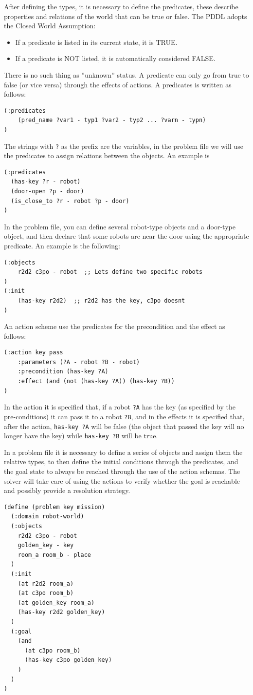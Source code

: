 \documentclass[10pt, letterpaper]{report}
\begin{document}
After defining the types, it is necessary to define the predicates, these describe properties and relations of the world that can be true or false.
The PDDL adopts the Closed World Assumption:
\begin{itemize}
\item If a predicate is listed in its current state, it is TRUE.
\item If a predicate is NOT listed, it is automatically considered FALSE.
\end{itemize}
There is no such thing as ''unknown'' status. A predicate can only go from true to false (or vice versa) through the effects of actions. A predicates is written as follows:\begin{lstlisting}
(:predicates
    (pred_name ?var1 - typ1 ?var2 - typ2 ... ?varn - typn)    
)
\end{lstlisting}
The strings with \texttt{?} as the prefix are the variables, in the problem file we will use the predicates to assign relations between the objects. An example is\begin{lstlisting}
(:predicates
  (has-key ?r - robot)       
  (door-open ?p - door)    
  (is_close_to ?r - robot ?p - door) 
)
\end{lstlisting}
In the problem file, you can define several robot-type objects and a door-type object, and then declare that some robots are near the door using the appropriate predicate. An example is the following:\begin{lstlisting}
(:objects 
    r2d2 c3po - robot  ;; Lets define two specific robots
)
(:init 
    (has-key r2d2)  ;; r2d2 has the key, c3po doesnt
)
\end{lstlisting}
An action scheme use the predicates for the precondition and the effect as follows:\begin{lstlisting}
(:action key pass
    :parameters (?A - robot ?B - robot)
    :precondition (has-key ?A)
    :effect (and (not (has-key ?A)) (has-key ?B))
)   
\end{lstlisting}
In the action it is specified that, if a robot \texttt{?A} has the key (as specified by the pre-conditions) it can pass it to a robot \texttt{?B}, and in the effects it is specified that, after the action, \texttt{has-key ?A} will be false (the object that passed the key will no longer have the key) while \texttt{has-key ?B} will be true.\bigskip 

\noindent
In a problem file it is necessary to define a series of objects and assign them the relative types, to then define the initial conditions through the predicates, and the goal state to always be reached through the use of the action schemas. The solver will take care of using the actions to verify whether the goal is reachable and possibly provide a resolution strategy.\begin{lstlisting}
(define (problem key mission)
  (:domain robot-world) 
  (:objects 
    r2d2 c3po - robot         
    golden_key - key       
    room_a room_b - place
  )
  (:init 
    (at r2d2 room_a)
    (at c3po room_b)
    (at golden_key room_a)
    (has-key r2d2 golden_key)
  )
  (:goal 
    (and 
      (at c3po room_b)
      (has-key c3po golden_key)
    )
  )
)
\end{lstlisting}
\end{document}
